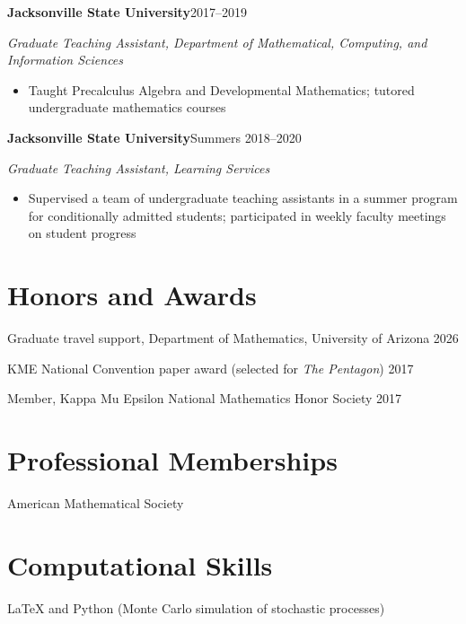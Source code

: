 \documentclass[11pt,letterpaper]{article}
\newcommand{\entry}[2]{\Needspace{4\baselineskip}\noindent\textbf{#1}\hfill #2\par}
\newcommand{\subentry}[1]{\noindent\textit{#1}\par}
\begin{document}
\medskip
\entry{Jacksonville State University}{2017--2019}
\subentry{Graduate Teaching Assistant, Department of Mathematical, Computing, and Information Sciences}
\begin{itemize}
  \item Taught Precalculus Algebra and Developmental Mathematics;
        tutored undergraduate mathematics courses
\end{itemize}

\medskip
\entry{Jacksonville State University}{Summers 2018--2020}
\subentry{Graduate Teaching Assistant, Learning Services}
\begin{itemize}
  \item Supervised a team of undergraduate teaching assistants in a
        summer program for conditionally admitted students; participated
        in weekly faculty meetings on student progress
\end{itemize}

\section{Honors and Awards}
Graduate travel support, Department of Mathematics, University of Arizona \hfill 2026\par
KME National Convention paper award (selected for \emph{The Pentagon}) \hfill 2017\par
Member, Kappa Mu Epsilon National Mathematics Honor Society \hfill 2017\par

\section{Professional Memberships}
American Mathematical Society

\section{Computational Skills}
\LaTeX{} and Python (Monte Carlo simulation of stochastic processes)
\end{document}
